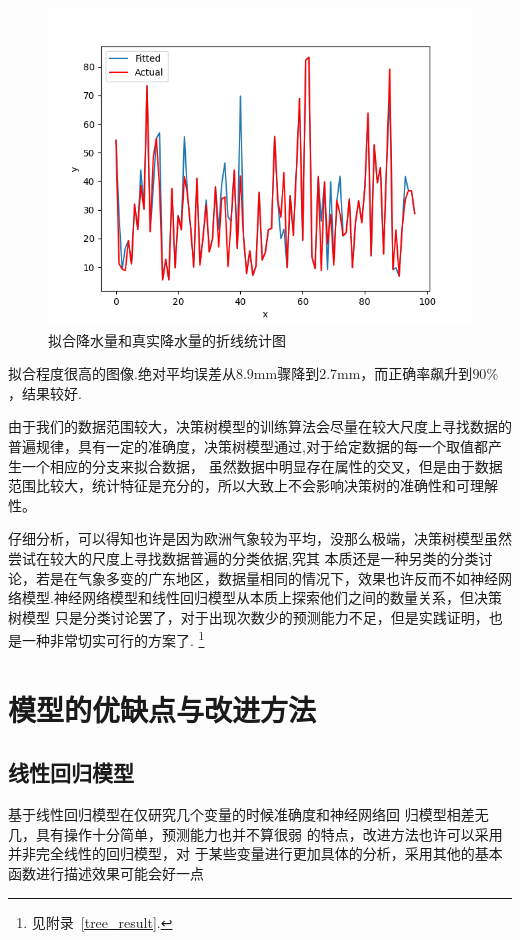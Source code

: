 \documentclass[UTF8, a4paper]{ctexart}
\begin{document}
\begin{figure}[h!]
	\centering
	\includegraphics[scale=0.3]{very_success.png}
	\caption{拟合降水量和真实降水量的折线统计图}\label{pic10}
\end{figure}

拟合程度很高的图像.绝对平均误差从$8.9$\si{\milli\meter}骤降到$2.7$\si{\milli\meter}，而正确率飙升到$90\%$，结果较好.

由于我们的数据范围较大，决策树模型的训练算法会尽量在较大尺度上寻找数据的普遍规律，具有一定的准确度，决策树模型通过,对于给定数据的每一个取值都产生一个相应的分支来拟合数据，
虽然数据中明显存在属性的交叉，但是由于数据范围比较大，统计特征是充分的，所以大致上不会影响决策树的准确性和可理解性。

仔细分析，可以得知也许是因为欧洲气象较为平均，没那么极端，决策树模型虽然尝试在较大的尺度上寻找数据普遍的分类依据,究其
本质还是一种另类的分类讨论，若是在气象多变的广东地区，数据量相同的情况下，效果也许反而不如神经网
络模型.神经网络模型和线性回归模型从本质上探索他们之间的数量关系，但决策树模型
只是分类讨论罢了，对于出现次数少的预测能力不足，但是实践证明，也是一种非常切实可行的方案了.
\footnote{见附录~\textcolor{red}{\ref{tree_result}}.}


\section{模型的优缺点与改进方法}

\subsection{线性回归模型}
基于线性回归模型在仅研究几个变量的时候准确度和神经网络回
归模型相差无几，具有操作十分简单，预测能力也并不算很弱
的特点，改进方法也许可以采用并非完全线性的回归模型，对
于某些变量进行更加具体的分析，采用其他的基本函数进行描述效果可能会好一点
\end{document}
